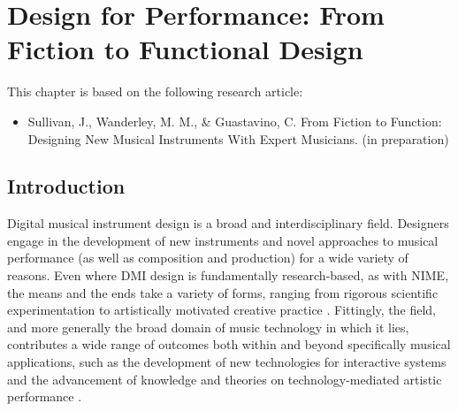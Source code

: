 \documentclass[Sullivan_phd_thesis.tex]{subfiles}
\begin{document}
\chapter{Design for Performance: From Fiction to Functional Design}
\label{ch3-cha}


\begin{singlespace}

    This chapter is based on the following research article:

    \begin{itemize}
        \item Sullivan, J., Wanderley, M. M., \& Guastavino, C. From Fiction to Function: Designing New Musical Instruments With Expert Musicians. (in preparation)
    \end{itemize}
\end{singlespace}



\section{Introduction}

Digital musical instrument design is a broad and interdisciplinary field. Designers engage in the development of new instruments and novel approaches to musical performance (as well as composition and production) for a wide variety of reasons. Even where DMI design is fundamentally research-based, as with NIME, the means and the ends take a variety of forms, ranging from rigorous scientific experimentation to artistically motivated creative practice \parencite{Gurevich2016}. Fittingly, the field, and more generally the broad domain of music technology in which it lies, contributes a wide range of outcomes both within and beyond specifically musical applications, such as the development of new technologies for interactive systems \parencite{malloch2018generalized} and the advancement of knowledge and theories on technology-mediated artistic performance \parencite{Tahlroglu2020}. 
\end{document}
